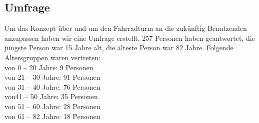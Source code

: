 \subsection{Umfrage}
Um das Konzept über und um den Fahrradturm an die zukünftig Benutzenden anzupassen haben wir eine Umfrage erstellt. 257 Personen haben geantwortet, die jüngste Person war 15 Jahre alt, die älteste Person war 82 Jahre. Folgende Altersgruppen waren vertreten:\\
von 0 – 20 Jahre: 9 Personen\\
von 21 – 30 Jahre: 91 Personen\\
von 31 – 40 Jahre: 76 Personen\\
von41 – 50 Jahre: 35 Personen\\
von 51 – 60 Jahre: 28 Personen\\
von 61 – 82 Jahre: 18 Personen\\\\

